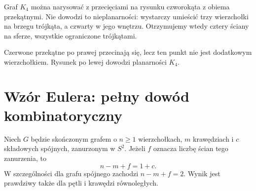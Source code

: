 \begin{przyklad}
Graf $K_4$ można narysować z przecięciami na rysunku czworokąta
z obiema przekątnymi. Nie dowodzi to nieplanarności: wystarczy
umieścić trzy wierzchołki na brzegu trójkąta, a czwarty w jego wnętrzu.
Otrzymujemy wtedy cztery ściany na sferze, wszystkie ograniczone
trójkątami.
\end{przyklad}

\begin{center}

{\footnotesize Czerwone przekątne po prawej przecinają się, lecz ten punkt
nie jest dodatkowym wierzchołkiem. Rysunek po lewej dowodzi planarności $K_4$.}
\end{center}

\section{Wzór Eulera: pełny dowód kombinatoryczny}
\label{sec:tg-planarny-euler}

\begin{twierdzenie}
\label{thm:tg-euler-plane}
Niech $G$ będzie skończonym grafem o $n\ge1$ wierzchołkach,
$m$ krawędziach i $c$ składowych spójnych, zanurzonym w $S^2$.
Jeżeli $f$ oznacza liczbę ścian tego zanurzenia, to
\[
 n-m+f=1+c.
\]
W szczególności dla grafu spójnego zachodzi $n-m+f=2$.
Wynik jest prawdziwy także dla pętli i krawędzi równoległych.
\end{twierdzenie}

